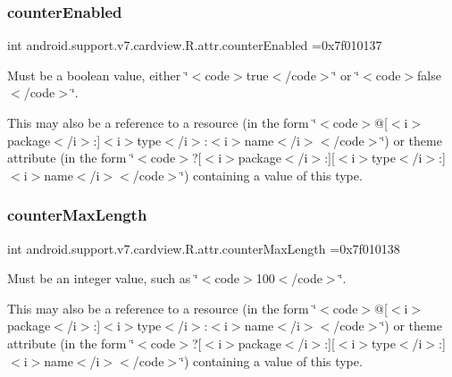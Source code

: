 \subsubsection{\texorpdfstring{counter\+Enabled}{counterEnabled}}
{\footnotesize\ttfamily int android.\+support.\+v7.\+cardview.\+R.\+attr.\+counter\+Enabled =0x7f010137\hspace{0.3cm}{\ttfamily [static]}}

Must be a boolean value, either \char`\"{}$<$code$>$true$<$/code$>$\char`\"{} or \char`\"{}$<$code$>$false$<$/code$>$\char`\"{}. 

This may also be a reference to a resource (in the form \char`\"{}$<$code$>$@\mbox{[}$<$i$>$package$<$/i$>$\+:\mbox{]}$<$i$>$type$<$/i$>$\+:$<$i$>$name$<$/i$>$$<$/code$>$\char`\"{}) or theme attribute (in the form \char`\"{}$<$code$>$?\mbox{[}$<$i$>$package$<$/i$>$\+:\mbox{]}\mbox{[}$<$i$>$type$<$/i$>$\+:\mbox{]}$<$i$>$name$<$/i$>$$<$/code$>$\char`\"{}) containing a value of this type. \mbox{\label{classandroid_1_1support_1_1v7_1_1cardview_1_1R_1_1attr_a353e93d414f0a1430ad4bbdcb581d346}} 
\subsubsection{\texorpdfstring{counter\+Max\+Length}{counterMaxLength}}
{\footnotesize\ttfamily int android.\+support.\+v7.\+cardview.\+R.\+attr.\+counter\+Max\+Length =0x7f010138\hspace{0.3cm}{\ttfamily [static]}}

Must be an integer value, such as \char`\"{}$<$code$>$100$<$/code$>$\char`\"{}. 

This may also be a reference to a resource (in the form \char`\"{}$<$code$>$@\mbox{[}$<$i$>$package$<$/i$>$\+:\mbox{]}$<$i$>$type$<$/i$>$\+:$<$i$>$name$<$/i$>$$<$/code$>$\char`\"{}) or theme attribute (in the form \char`\"{}$<$code$>$?\mbox{[}$<$i$>$package$<$/i$>$\+:\mbox{]}\mbox{[}$<$i$>$type$<$/i$>$\+:\mbox{]}$<$i$>$name$<$/i$>$$<$/code$>$\char`\"{}) containing a value of this type. \mbox{\label{classandroid_1_1support_1_1v7_1_1cardview_1_1R_1_1attr_a4a957d4beac1d3f3d9fd8967db38630c}} 
